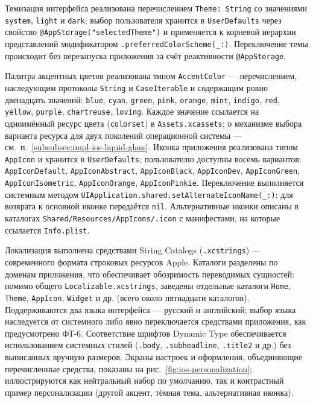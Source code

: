 Темизация интерфейса реализована перечислением \texttt{Theme: String} со значениями \texttt{system}, \texttt{light} и \texttt{dark}; выбор пользователя хранится в \texttt{UserDefaults} через свойство \texttt{@AppStorage("selectedTheme")} и применяется к корневой иерархии представлений модификатором \texttt{.preferredColorScheme(\_:)}. Переключение темы происходит без перезапуска приложения за счёт реактивности \texttt{@AppStorage}.

Палитра акцентных цветов реализована типом \texttt{AccentColor} --- перечислением, наследующим протоколы \texttt{String} и \texttt{CaseIterable} и содержащим ровно двенадцать значений: \texttt{blue}, \texttt{cyan}, \texttt{green}, \texttt{pink}, \texttt{orange}, \texttt{mint}, \texttt{indigo}, \texttt{red}, \texttt{yellow}, \texttt{purple}, \texttt{chartreuse}, \texttt{loving}. Каждое значение ссылается на одноимённый ресурс цвета (\texttt{colorset}) в \texttt{Assets.xcassets}; о механизме выбора варианта ресурса для двух поколений операционной системы --- см.~п.~\ref{subsubsec:impl-ios-liquid-glass}. Иконка приложения реализована типом \texttt{AppIcon} и хранится в \texttt{UserDefaults}; пользователю доступны восемь вариантов: \texttt{AppIconDefault}, \texttt{AppIconAbstract}, \texttt{AppIconBlack}, \texttt{AppIconDev}, \texttt{AppIconGreen}, \texttt{AppIconIsometric}, \texttt{AppIconOrange}, \texttt{AppIconPinkie}. Переключение выполняется системным методом \texttt{UIApplication.\allowbreak shared.\allowbreak setAlternateIconName(\_:)}; для возврата к основной иконке передаётся \texttt{nil}. Альтернативные иконки описаны в каталогах \texttt{Shared/\allowbreak Resources/\allowbreak AppIcons/\allowbreak *.icon} с манифестами, на которые ссылается \texttt{Info.plist}.

Локализация выполнена средствами String Catalogs (\texttt{.xcstrings}) --- современного формата строковых ресурсов Apple. Каталоги разделены по доменам приложения, что обеспечивает обозримость переводимых сущностей: помимо общего \texttt{Localizable.xcstrings}, заведены отдельные каталоги \texttt{Home}, \texttt{Theme}, \texttt{AppIcon}, \texttt{Widget} и др. (всего около пятнадцати каталогов). Поддерживаются два языка интерфейса --- русский и английский; выбор языка наследуется от системного либо явно переключается средствами приложения, как предусмотрено ФТ-6. Соответствие шрифтов Dynamic Type обеспечивается использованием системных стилей (\texttt{.body}, \texttt{.subheadline}, \texttt{.title2} и др.) без выписанных вручную размеров. Экраны настроек и оформления, объединяющие перечисленные средства, показаны на рис.~\ref{fig:ios-personalization}; иллюстрируются как нейтральный набор по умолчанию, так и контрастный пример персонализации (другой акцент, тёмная тема, альтернативная иконка).


